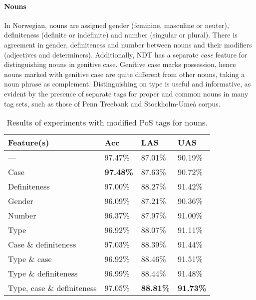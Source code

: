 \documentclass[11pt,a4paper]{article}
\begin{document}
\paragraph{Nouns}
In Norwegian, nouns are assigned gender (feminine, masculine or neuter),
definiteness (definite or indefinite) and number (singular or plural). There is
agreement in gender, definiteness and number between nouns and their modifiers
(adjectives and determiners). Additionally, NDT has a separate \emph{case}
feature for distinguishing nouns in genitive case. Genitive case marks
possession, hence nouns marked with genitive case are quite different from
other nouns, taking a noun phrase as complement. Distinguishing on type is
useful and informative, as evident by the presence of separate tags for proper
and common nouns in many tag sets, such as those of Penn Treebank and
Stockholm-Umeå corpus.

\begin{table}
    \centering
    \smaller[1]
    \begin{tabular}{@{}llll@{}}
        \toprule
        \textbf{Feature(s)} & \textbf{Acc} & \textbf{LAS} & \textbf{UAS}
        \\
        \midrule
        --- & 97.47\% & 87.01\% & 90.19\% \\
        Case & \textbf{97.48\%} & 87.63\% & 90.72\% \\
        Definiteness & 97.00\% & 88.27\% & 91.42\% \\
        Gender & 96.09\% & 87.21\% & 90.36\% \\
        Number & 96.37\% & 87.97\% & 91.00\% \\
        Type & 96.92\% & 88.07\% & 91.11\% \\
        Case \& definiteness & 97.03\% & 88.39\% & 91.44\% \\
        Type \& case & 96.92\% & 88.46\% & 91.51\% \\
        Type \& definiteness & 96.99\% & 88.44\% & 91.48\% \\
        Type, case \& definiteness & 97.05\% & \textbf{88.81\%} &
        \textbf{91.73\%} \\
        \bottomrule
    \end{tabular}
    \caption{Results of experiments with modified PoS tags for nouns.}
    \label{substresults}
\end{table}
\end{document}
